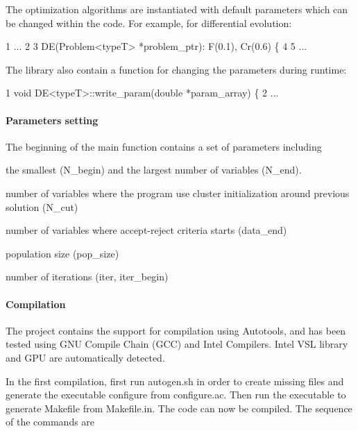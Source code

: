 The optimization algorithms are instantiated with default parameters which can be changed within the code. For example, for differential evolution\+:


\begin{DoxyCode}
1 ...
2 
3 DE(Problem<typeT> *problem\_ptr): F(0.1), Cr(0.6) \{
4 
5 ...
\end{DoxyCode}


The library also contain a function for changing the parameters during runtime\+:


\begin{DoxyCode}
1 void DE<typeT>::write\_param(double *param\_array) \{
2 ...
\end{DoxyCode}


\paragraph*{Parameters setting}

The beginning of the main function contains a set of parameters including


\begin{DoxyItemize}
\item the smallest (N\+\_\+begin) and the largest number of variables (N\+\_\+end).
\item number of variables where the program use cluster initialization around previous solution (N\+\_\+cut)
\item number of variables where accept-\/reject criteria starts (data\+\_\+end)
\item population size (pop\+\_\+size)
\item number of iterations (iter, iter\+\_\+begin)
\end{DoxyItemize}

\paragraph*{Compilation}

The project contains the support for compilation using Autotools, and has been tested using G\+N\+U Compile Chain (G\+C\+C) and Intel Compilers. Intel V\+S\+L library and G\+P\+U are automatically detected.

In the first compilation, first run autogen.\+sh in order to create missing files and generate the executable configure from configure.\+ac. Then run the executable to generate Makefile from Makefile.\+in. The code can now be compiled. The sequence of the commands are


